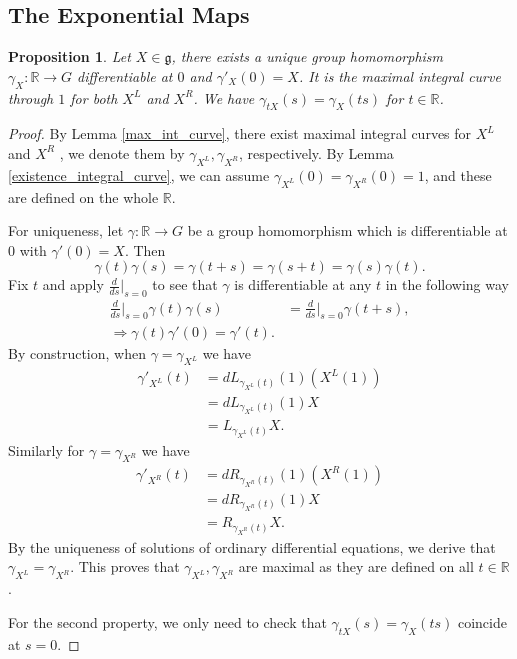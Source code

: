 \documentclass{article}
\newtheorem{proposition}{Proposition}[section]
\numberwithin{equation}{section}
\begin{document}
\subsection{The Exponential Maps}

\begin{proposition}
Let $X\in\mathfrak{g}$, there exists a unique group homomorphism $\gamma_X:\mathbb{R}\to G$ differentiable at $0$ and $\gamma'_X(0)=X$. It is the maximal integral curve through $1$ for both $X^L$ and $X^R$. We have $\gamma_{tX}(s)=\gamma_X(ts)$ for $t\in \mathbb{R}$. 
\end{proposition}

\begin{proof}
By Lemma \ref{max_int_curve}, there exist maximal integral curves for $X^L$ and $X^R$ , we denote them by $\gamma_{X^L},\gamma_{X^R}$, respectively. By Lemma \ref{existence_integral_curve}, we can assume $\gamma_{X^L}(0)=\gamma_{X^R}(0)=1$, and these are defined on the whole $\mathbb{R}$.\\
\par For uniqueness, let $\gamma:\mathbb{R}\to G$ be a group homomorphism which is differentiable at $0$ with $\gamma'(0)=X$. Then
\begin{equation}
\label{commutativity_curve}
\gamma(t)\gamma(s) = \gamma(t+s)=\gamma(s+t)=\gamma(s)\gamma(t).
\end{equation}
Fix $t$ and apply ${\frac {d} {ds}}|_{s=0}$ to see that $\gamma$ is differentiable at any $t$ in the following way
\begin{align*}
{\frac d {ds}}|_{s=0}\gamma(t)\gamma(s) &= {\frac d {ds}}|_{s=0}\gamma(t+s),\\
\Rightarrow\gamma(t)\gamma'(0) = \gamma'(t).
\end{align*}
By construction, when $\gamma=\gamma_{X^L}$ we have
\begin{align*}
\gamma'_{X^L}(t) &= dL_{\gamma_{X^L}(t)}(1)(X^L(1))\\
& = dL_{\gamma_{X^L}(t)}(1)X\\
& = L_{\gamma_{X^L}(t)}X.
\end{align*}
Similarly for $\gamma=\gamma_{X^R}$ we have
\begin{align*}
\gamma'_{X^R}(t) &= dR_{\gamma_{X^R}(t)}(1)(X^R(1))\\
& = dR_{\gamma_{X^R}(t)}(1)X\\
& = R_{\gamma_{X^R}(t)}X.
\end{align*}
By the uniqueness of solutions of ordinary differential equations, we derive that $\gamma_{X^L}=\gamma_{X^R}$.
This proves that $\gamma_{X^L},\gamma_{X^R}$ are maximal as they are defined on all $t\in\mathbb{R}$.\\
\par For the second property, we only need to check that $\gamma_{tX}(s)=\gamma_X(ts)$ coincide at $s=0$.
\end{proof}
\end{document}
